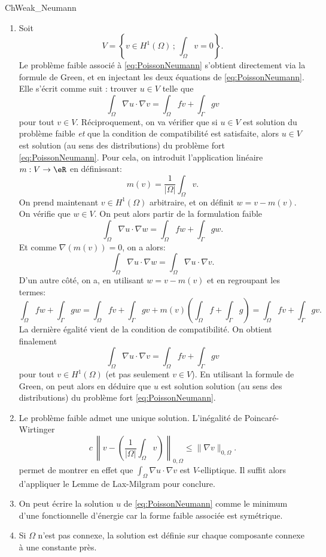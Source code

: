\begin{corrige}{ChWeak_Neumann}
\begin{enumerate}
\item %
Soit 
\[
V = \left \{ v \in H^1(\Omega) \, ; \, \int_\Omega v = 0 \right \}.
\]
Le problème faible associé à \eqref{eq:PoissonNeumann} s'obtient directement via la formule de Green, et en injectant les deux équations de \eqref{eq:PoissonNeumann}. Elle s'écrit comme suit : trouver $u\in V$ telle que
\[
\int_\Omega \nabla u \cdot \nabla v = \int_\Omega f v + \int_\Gamma gv
\]
pour tout $v \in V$.
Réciproquement, on va vérifier que si $u\in V$ est solution du problème faible \emph{et} que la condition de compatibilité est satisfaite, alors $u\in V$ est solution (au sens des distributions) du problème fort \eqref{eq:PoissonNeumann}. Pour cela, on introduit l'application linéaire $m : V \rightarrow \eR$ en définissant:
\[
m(v) = \frac{1}{|\Omega|} \int_\Omega v.
\]
On prend maintenant $v \in H^1(\Omega)$ arbitraire, et on définit $w=v - m(v)$. On vérifie que $w\in V$. On peut alors partir de la formulation faible
\[
\int_\Omega \nabla u \cdot \nabla w = \int_\Omega f w + \int_\Gamma gw.
\]
Et comme $\nabla (m(v))=0$, on a alors:
\[
\int_\Omega \nabla u \cdot \nabla w = \int_\Omega \nabla u \cdot \nabla v.
\]
D'un autre côté, on a, en utilisant $w=v-m(v)$ et en regroupant les termes:
\[
\int_\Omega f w + \int_\Gamma gw
=
\int_\Omega f v + \int_\Gamma gv + m(v)\left ( \int_\Omega f + \int_\Gamma g \right) 
= \int_\Omega f v + \int_\Gamma gv.
\]
La dernière égalité vient de la condition de compatibilité.
On obtient finalement 
\[
\int_\Omega \nabla u \cdot \nabla v = \int_\Omega f v + \int_\Gamma gv
\]
pour tout $v \in H^1(\Omega)$ (et pas seulement $v \in V$). En utilisant la formule de Green, on peut alors en déduire que $u$ est solution solution (au sens des distributions) du problème fort \eqref{eq:PoissonNeumann}.


\item Le problème faible admet une unique solution. L'inégalité de Poincaré-Wirtinger %
\[
c \, \left \| v - \left( \frac1{|\Omega|} \int_\Omega v \right ) \right \|_{0,\Omega} \leq \| \nabla v \|_{0,\Omega}.
\]
permet de montrer en effet que $\int_\Omega \nabla u \cdot \nabla v$ est $V$-elliptique. Il suffit alors d'appliquer le Lemme de Lax-Milgram pour conclure.

\item On peut écrire la solution $u$ de \eqref{eq:PoissonNeumann} comme le minimum d'une fonctionnelle d'énergie car la forme faible associée est symétrique.

\item Si $\Omega$ n'est pas connexe, la solution est définie sur chaque composante connexe à une constante près.

\end{enumerate}

\end{corrige}

